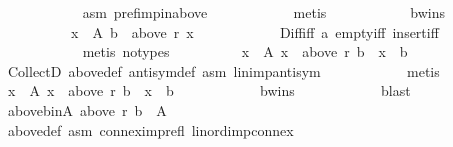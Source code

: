 \begin{isabellebody}
\ \ \ \ \ \ \ \ \ \ \isamarkupfalse%
\ asm{}\ pref{\isacharunderscore}{\kern0pt}imp{\isacharunderscore}{\kern0pt}in{\isacharunderscore}{\kern0pt}above\isanewline
\ \ \ \ \ \ \ \ \ \ \isamarkupfalse%
\ metis\isanewline
\ \ \ \ \ \ \ \ \isamarkupfalse%
\ \isamarkupfalse%
\ b{\isacharunderscore}{\kern0pt}wins{\isacharcolon}{\kern0pt}\isanewline
\ \ \ \ \ \ \ \ \ \ {\isachardoublequoteopen}{\isasymforall}x\ {\isasymin}\ A{\isachardot}{\kern0pt}\ b\ {\isasymin}\ above\ r\ x{\isachardoublequoteclose}\isanewline
\ \ \ \ \ \ \ \ \ \ \isamarkupfalse%
\ Diff{\isacharunderscore}{\kern0pt}iff\ a\ empty{\isacharunderscore}{\kern0pt}iff\ insert{\isacharunderscore}{\kern0pt}iff\isanewline
\ \ \ \ \ \ \ \ \ \ \isamarkupfalse%
\ {\isacharparenleft}{\kern0pt}metis\ {\isacharparenleft}{\kern0pt}no{\isacharunderscore}{\kern0pt}types{\isacharparenright}{\kern0pt}{\isacharparenright}{\kern0pt}\isanewline
\ \ \ \ \ \ \ \ \isamarkupfalse%
\ {\isachardoublequoteopen}{\isasymforall}x\ {\isasymin}\ A{\isachardot}{\kern0pt}\ x\ {\isasymin}\ above\ r\ b\ {\isasymlongrightarrow}\ x\ {\isacharequal}{\kern0pt}\ b{\isachardoublequoteclose}\isanewline
\ \ \ \ \ \ \ \ \ \ \isamarkupfalse%
\ CollectD\ above{\isacharunderscore}{\kern0pt}def\ antisym{\isacharunderscore}{\kern0pt}def\ asm\ lin{\isacharunderscore}{\kern0pt}imp{\isacharunderscore}{\kern0pt}antisym\isanewline
\ \ \ \ \ \ \ \ \ \ \isamarkupfalse%
\ metis\isanewline
\ \ \ \ \ \ \ \ \isamarkupfalse%
\ {\isachardoublequoteopen}{\isasymforall}x\ {\isasymin}\ A{\isachardot}{\kern0pt}\ x\ {\isasymin}\ above\ r\ b\ {\isasymlongleftrightarrow}\ x\ {\isacharequal}{\kern0pt}\ b{\isachardoublequoteclose}\isanewline
\ \ \ \ \ \ \ \ \ \ \isamarkupfalse%
\ b{\isacharunderscore}{\kern0pt}wins\isanewline
\ \ \ \ \ \ \ \ \ \ \isamarkupfalse%
\ blast\isanewline
\ \ \ \ \ \ \ \ \isamarkupfalse%
\ \isamarkupfalse%
\ above{\isacharunderscore}{\kern0pt}b{\isacharunderscore}{\kern0pt}in{\isacharunderscore}{\kern0pt}A{\isacharcolon}{\kern0pt}\ {\isachardoublequoteopen}above\ r\ b\ {\isasymsubseteq}\ A{\isachardoublequoteclose}\isanewline
\ \ \ \ \ \ \ \ \ \ \isamarkupfalse%
\ above{\isacharunderscore}{\kern0pt}def\ asm\ connex{\isacharunderscore}{\kern0pt}imp{\isacharunderscore}{\kern0pt}refl\ lin{\isacharunderscore}{\kern0pt}ord{\isacharunderscore}{\kern0pt}imp{\isacharunderscore}{\kern0pt}connex\isanewline

\end{isabellebody}
